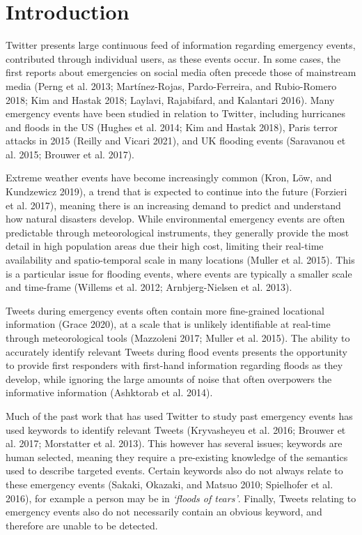 \documentclass[a4paper, notitlepage]{extreport}
\begin{document}
\listoffigures

\listoftables

\newpage


\chapter{Introduction}

Twitter presents large continuous feed of information regarding
emergency events, contributed through individual users, as these events
occur. In some cases, the first reports about emergencies on social
media often precede those of mainstream media (Perng et al. 2013;
Martínez-Rojas, Pardo-Ferreira, and Rubio-Romero 2018; Kim and Hastak
2018; Laylavi, Rajabifard, and Kalantari 2016). Many emergency events
have been studied in relation to Twitter, including hurricanes and
floods in the US (Hughes et al. 2014; Kim and Hastak 2018), Paris terror
attacks in 2015 (Reilly and Vicari 2021), and UK flooding events
(Saravanou et al. 2015; Brouwer et al. 2017).

Extreme weather events have become increasingly common (Kron, Löw, and
Kundzewicz 2019), a trend that is expected to continue into the future
(Forzieri et al. 2017), meaning there is an increasing demand to predict
and understand how natural disasters develop. While environmental
emergency events are often predictable through meteorological
instruments, they generally provide the most detail in high population
areas due their high cost, limiting their real-time availability and
spatio-temporal scale in many locations (Muller et al. 2015). This is a
particular issue for flooding events, where events are typically a
smaller scale and time-frame (Willems et al. 2012; Arnbjerg-Nielsen et
al. 2013).

Tweets during emergency events often contain more fine-grained
locational information (Grace 2020), at a scale that is unlikely
identifiable at real-time through meteorological tools (Mazzoleni 2017;
Muller et al. 2015). The ability to accurately identify relevant Tweets
during flood events presents the opportunity to provide first responders
with first-hand information regarding floods as they develop, while
ignoring the large amounts of noise that often overpowers the
informative information (Ashktorab et al. 2014).

Much of the past work that has used Twitter to study past emergency
events has used keywords to identify relevant Tweets (Kryvasheyeu et al.
2016; Brouwer et al. 2017; Morstatter et al. 2013). This however has
several issues; keywords are human selected, meaning they require a
pre-existing knowledge of the semantics used to describe targeted
events. Certain keywords also do not always relate to these emergency
events (Sakaki, Okazaki, and Matsuo 2010; Spielhofer et al. 2016), for
example a person may be in \emph{`floods of tears'}. Finally, Tweets
relating to emergency events also do not necessarily contain an obvious
keyword, and therefore are unable to be detected.
\end{document}
